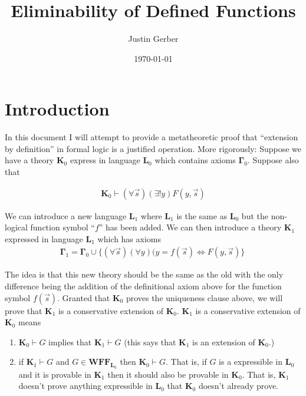 \documentclass[12pt]{article}
\newcommand{\bv}[1]{\boldsymbol{#1}}
\begin{document}
	
\title{Eliminability of Defined Functions}
\author{Justin Gerber}
\date{\today}
\maketitle

\section{Introduction}

In this document I will attempt to provide a metatheoretic proof that ``extension by definition'' in formal logic is a justified operation. More rigorously: Suppose we have a theory $\bv{K}_0$ express in language $\bv{L}_0$ which contains axioms $\bv{\Gamma}_0$. Suppose also that 

\begin{align}
\bv{K}_0 \vdash (\forall \vec{s})(\exists !y)F(y, \vec{s})
\end{align}

We can introduce a new language $\bv{L}_1$ where $\bv{L}_1$ is the same as $\bv{L}_0$ but the non-logical function symbol ``$f$'' has been added. We can then introduce a theory $\bv{K}_1$ expressed in language $\bv{L}_1$ which has axioms 
\begin{align}
\bv{\Gamma}_1 = \bv{\Gamma}_0 \cup \{(\forall \vec{s})(\forall y)(y = f(\vec{s}) \iff F(y, \vec{s})\}\
\end{align}

The idea is that this new theory should be the same as the old with the only difference being the addition of the definitional axiom above for the function symbol $f(\vec{s})$.
Granted that $\bv{K}_0$ proves the uniqueness clause above, we will prove that $\bv{K}_1$ is a conservative extension of $\bv{K}_0$. $\bv{K}_1$ is a conservative extension of $\bv{K}_0$ means

\begin{enumerate}
	\item $\bv{K}_0 \vdash G$ implies that $\bv{K}_1 \vdash G$ (this says that $\bv{K}_1$ is an extension of $\bv{K}_0$.)
	\item if $\bv{K}_1 \vdash G$ and $G \in \textbf{WFF}_{\bv{L}_0}$ then $\bv{K}_0 \vdash G$. That is, if $G$ is a expressible in $\bv{L}_0$ and it is provable in $\bv{K}_1$ then it should also be provable in $\bv{K}_0$. That is, $\bv{K}_1$ doesn't prove anything expressible in $\bv{L}_0$ that $\bv{K}_0$ doesn't already prove.
\end{enumerate}
\end{document}
